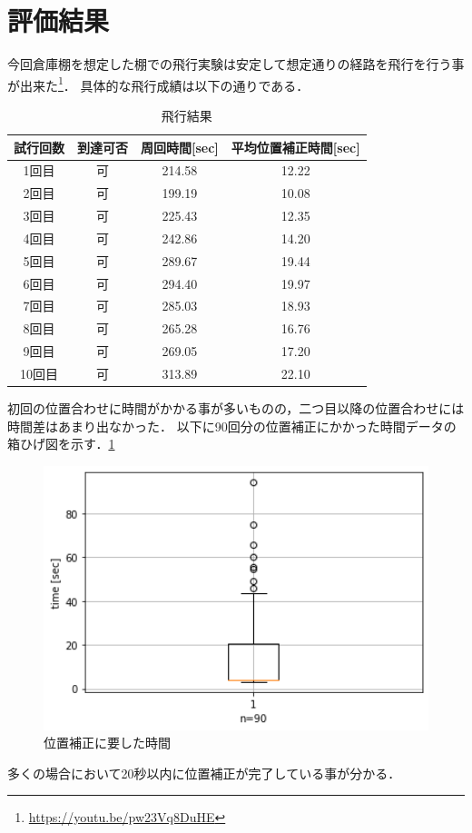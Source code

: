 \section{評価結果}
今回倉庫棚を想定した棚での飛行実験は安定して想定通りの経路を飛行を行う事が出来た\footnote{\url{https://youtu.be/pw23Vq8DuHE}}．
具体的な飛行成績は以下の通りである．

\begin{table}[h]
    \caption{飛行結果}
    \label{table:fly_result}
    \centering
    \begin{tabular}{cccc}
        \hline
        試行回数 & 到達可否 & 周回時間[sec] & 平均位置補正時間[sec] \\
        \hline \hline
        1回目 & 可 & 214.58 & 12.22 \\
        2回目 & 可 & 199.19 & 10.08 \\
        3回目 & 可 & 225.43 & 12.35 \\
        4回目 & 可 & 242.86 & 14.20 \\
        5回目 & 可 & 289.67 & 19.44 \\
        6回目 & 可 & 294.40 & 19.97 \\
        7回目 & 可 & 285.03 & 18.93 \\
        8回目 & 可 & 265.28 & 16.76 \\
        9回目 & 可 & 269.05 & 17.20 \\
        10回目 & 可 & 313.89 & 22.10 \\
        \hline
    \end{tabular}
\end{table}

初回の位置合わせに時間がかかる事が多いものの，二つ目以降の位置合わせには時間差はあまり出なかった．
以下に90回分の位置補正にかかった時間データの箱ひげ図を示す．\ref{box_plot}

\begin{figure}[htbp]
    \begin{center}
      \includegraphics[clip,width=15.0cm]{img/timedata.png}
      \caption{位置補正に要した時間}
      \label{box_plot}
    \end{center}
  \end{figure}

  多くの場合において20秒以内に位置補正が完了している事が分かる．